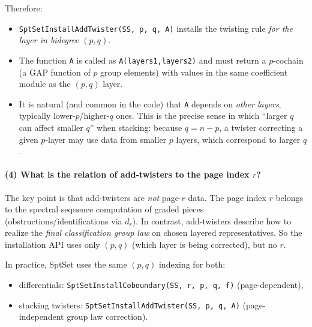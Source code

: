 \documentclass{SciPost}
\begin{document}
Therefore:
\begin{itemize}
    \item \texttt{SptSetInstallAddTwister(SS, p, q, A)} installs the twisting rule \emph{for the layer in bidegree $(p,q)$}.
    \item The function \texttt{A} is called as \texttt{A(layers1,layers2)} and must return a $p$-cochain (a GAP function of $p$ group elements) with values in the same coefficient module as the $(p,q)$ layer.
    \item It is natural (and common in the code) that \texttt{A} depends on \emph{other layers}, typically lower-$p$/higher-$q$ ones. This is the precise sense in which ``larger $q$ can affect smaller $q$'' when stacking: because $q=n-p$, a twister correcting a given $p$-layer may use data from smaller $p$ layers, which correspond to larger $q$.
\end{itemize}

\paragraph{(4) What is the relation of add-twisters to the page index $r$?}
The key point is that add-twisters are \emph{not} page-$r$ data.
The page index $r$ belongs to the spectral sequence computation of graded pieces (obstructions/identifications via $d_r$). In contrast, add-twisters describe how to realize the \emph{final classification group law} on chosen layered representatives.
So the installation API uses only $(p,q)$ (which layer is being corrected), but no $r$.

In practice, SptSet uses the same $(p,q)$ indexing for both:
\begin{itemize}
    \item differentials: \texttt{SptSetInstallCoboundary(SS, r, p, q, f)} (page-dependent),
    \item stacking twisters: \texttt{SptSetInstallAddTwister(SS, p, q, A)} (page-independent group law correction).
\end{itemize}
\end{document}
